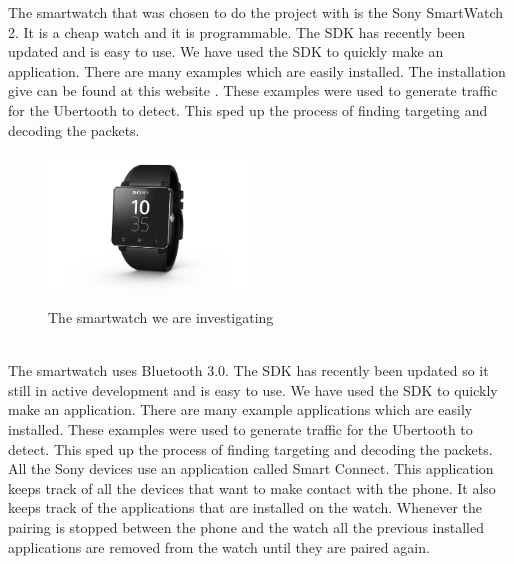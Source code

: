 \label{subsec:sw2}
The smartwatch that was chosen to do the project with is the Sony 
SmartWatch 2. It is a cheap watch and it is programmable. The SDK has recently been updated and is easy to use. We have used the SDK to quickly make an application. There are many examples which are easily installed. The installation give can be found at this website \cite{sw2_install}. These examples were used to generate traffic for the Ubertooth to detect. This sped up the process of finding targeting and decoding the packets. 
\begin{figure}[!h]
  \begin{center}
	\includegraphics[width=200px]{images/sw2.jpg}
	\label{fig:sw2}
	\caption{The smartwatch we are investigating}
  \end{center}
\end{figure}
\\

The smartwatch uses Bluetooth 3.0. The SDK has recently been updated so it still in active development and is easy to use. We have used the SDK to quickly make an application. There are many example applications which are easily installed. These examples were used to generate traffic for the Ubertooth to detect. This sped up the process of finding targeting and decoding the packets. \pend
All the Sony devices use an application called Smart Connect. This application keeps track of all the devices that want to make contact with the phone. It also keeps track of the applications that are installed on the watch. Whenever the pairing is stopped between the phone and the watch all the previous installed applications are removed from the watch until they are paired again.
